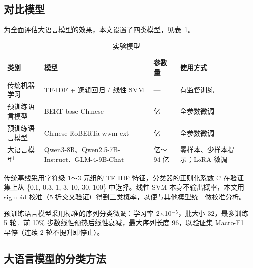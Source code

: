 \FloatBarrier\subsection{对比模型}

为全面评估大语言模型的效果，本文设置了四类模型，见表~\ref{tab:3-5}。

\begin{table}[htbp]
\centering
\begin{minipage}{\textwidth}
\setlength{\tabcolsep}{3pt}
\renewcommand{\arraystretch}{1.16}
\fontsize{10.5}{13.5}\selectfont
\caption{实验模型}\label{tab:3-5}
\begin{tabular}{>{\raggedright\arraybackslash}p{}>{\raggedright\arraybackslash}p{}>{\raggedright\arraybackslash}p{}>{\raggedright\arraybackslash}p{}}
\toprule
\textbf{类别} & \textbf{模型} & \textbf{参数量} & \textbf{使用方式} \\
\midrule
传统机器学习 & TF-\allowbreak{}IDF + 逻辑回归 /\allowbreak{} 线性 SVM & — & 有监督训练 \\
预训练语言模型 & BERT-\allowbreak{}base-\allowbreak{}Chinese\cite{ref7} & 1.0 亿 & 全参数微调 \\
预训练语言模型 & Chinese-\allowbreak{}RoBERTa-\allowbreak{}wwm-\allowbreak{}ext\cite{ref9} & 1.0 亿 & 全参数微调 \\
大语言模型 & Qwen3-\allowbreak{}8B、Qwen2.5-\allowbreak{}7B-\allowbreak{}Instruct、GLM-\allowbreak{}4-\allowbreak{}9B-\allowbreak{}Chat & 70 亿～94 亿 & 零样本、少样本提示；LoRA 微调 \\
\bottomrule\end{tabular}
\end{minipage}
\end{table}

传统基线采用字符级 1～3 元组的 TF-IDF 特征，分类器的正则化系数 C 在验证集上从 \{0.1, 0.3, 1, 3, 10, 30, 100\} 中选择。线性 SVM 本身不输出概率，本文用 sigmoid 校准（5 折交叉验证）得到三类概率，以便与其他模型统一做校准分析。

预训练语言模型采用标准的序列分类微调：学习率 2\(\times\)10\(^{-5}\)，批大小 32，最多训练 5 轮，前 10\% 步数线性预热后线性衰减，最大序列长度 96，以验证集 Macro-F1 早停（连续 2 轮不提升即停止）。

\FloatBarrier\subsection{大语言模型的分类方法}

